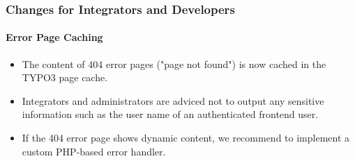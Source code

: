 %

\begin{frame}[fragile]
	\frametitle{Changes for Integrators and Developers}
	\framesubtitle{Error Page Caching}

	\begin{itemize}
		\item The content of 404 error pages ("page not found") is now cached
			in the TYPO3 page cache.
		\item Integrators and administrators are adviced not to output any
			sensitive information such as the user name of an authenticated
			frontend user.
		\item If the 404 error page shows dynamic content, we recommend to
			implement a custom PHP-based error handler.
	\end{itemize}

\end{frame}

